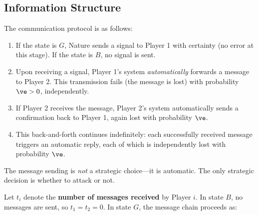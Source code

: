 \subsection{Information Structure}

The communication protocol is as follows:
\begin{enumerate}
  \item If the state is $G$, Nature sends a signal to Player 1 with certainty (no error at this stage). If the state is $B$, no signal is sent.
  \item Upon receiving a signal, Player 1's system \textit{automatically} forwards a message to Player 2. This transmission fails (the message is lost) with probability $\ve > 0$, independently.
  \item If Player 2 receives the message, Player 2's system automatically sends a confirmation back to Player 1, again lost with probability $\ve$.
  \item This back-and-forth continues indefinitely: each successfully received message triggers an automatic reply, each of which is independently lost with probability $\ve$.
\end{enumerate}
The message sending is \textit{not} a strategic choice---it is automatic. The only strategic decision is whether to attack or not.

Let $t_i$ denote the \textbf{number of messages received} by Player $i$. In state $B$, no messages are sent, so $t_1 = t_2 = 0$. In state $G$, the message chain proceeds as:
\begin{center}
\end{center}

